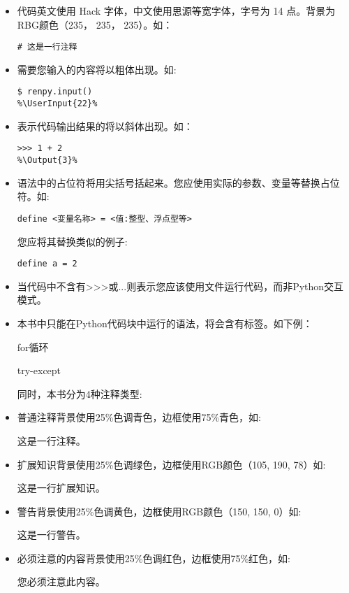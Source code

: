 \documentclass[../Main.tex]{subfiles}
\begin{document}
\begin{itemize}
    \item 代码英文使用 Hack 字体，中文使用思源等宽字体，字号为 14 点。背景为RBG颜色（235， 235， 235）。如：
    \begin{lstlisting}[numbers=none]
# 这是一行注释
    \end{lstlisting}

    \item 需要您输入的内容将以粗体出现。如:
    \begin{lstlisting}
$ renpy.input()
%\UserInput{22}%
    \end{lstlisting}

    \item 表示代码输出结果的将以斜体出现。如：
    \begin{lstlisting}
>>> 1 + 2
%\Output{3}%
    \end{lstlisting}

    \item 语法中的占位符将用尖括号括起来。您应使用实际的参数、变量等替换占位符。如:
    \begin{lstlisting}[numbers=none]
define <变量名称> = <值:整型、浮点型等>
    \end{lstlisting}
    您应将其替换类似的例子:
    \begin{lstlisting}[numbers=none]
define a = 2
    \end{lstlisting}

    \item 当代码中不含有>>>或...则表示您应该使用文件运行代码，而非Python交互模式。

    \item 本书中只能在Python代码块中运行的语法，将会含有\PyOnly 标签。如下例：


    for循环 \PyOnly
    
    try-except \PyOnly


    同时，本书分为4种注释类型:
    \item 普通注释背景使用25\%色调青色，边框使用75\%青色，如:
    \begin{Comment}
这是一行注释。
    \end{Comment}
    \item 扩展知识背景使用25\%色调绿色，边框使用RGB颜色（105, 190, 78）如:
    \begin{ExtraKnowledge}
    这是一行扩展知识。
    \end{ExtraKnowledge}
    \item 警告背景使用25\%色调黄色，边框使用RGB颜色（150, 150, 0）如:
    \begin{Warning}
    这是一行警告。
    \end{Warning}
    \item 必须注意的内容背景使用25\%色调红色，边框使用75\%红色，如:
    \begin{Attention}
    您必须注意此内容。
    \end{Attention}
\end{itemize}
\end{document}
